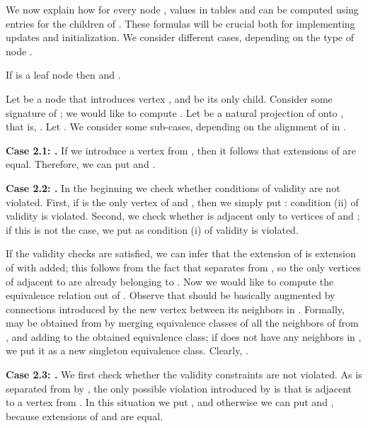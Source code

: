 \documentclass[a4paper,11pt]{article}
\theoremstyle{definition}
\theoremstyle{remark}
\begin{document}
We now explain how for every node , values in tables  and
 can be computed using entries for the children of .
These formulas will be crucial both for implementing updates and
initialization.  We consider different cases, depending on the type of
node . 

\vskip 0.3cm
 If  is a leaf node then
 and .  \vskip 0.3cm

 Let  be a node that
introduces vertex , and  be its only child.  Consider some
signature  of ; we would like to compute
.  Let  be a natural projection of  onto
, that is, .  Let
.  We consider some sub-cases, depending on the
alignment of  in .

\vskip 0.1cm {\bf{Case 2.1: .}} If we introduce a vertex from
, then it follows that extensions of  are equal.
Therefore, we can put  and
.

\vskip 0.1cm {\bf{Case 2.2: .}} In the beginning we check
whether conditions of validity are not violated.  First, if  is the
only vertex of  and , then we simply put
: condition (ii) of validity is violated.  Second, we
check whether  is adjacent only to vertices of  and ; if
this is not the case, we put  as condition (i) of
validity is violated.

If the validity checks are satisfied, we can infer that the extension
 of  is extension  of  with 
added; this follows from the fact that  separates  from ,
so the only vertices of  adjacent to  are already
belonging to .  Now we would like to compute the equivalence
relation  out of .  Observe that  should be basically
 augmented by connections introduced by the new vertex 
between its neighbors in .  Formally,  may be obtained from
 by merging equivalence classes of all the neighbors of  from
, and adding  to the obtained equivalence class; if  does
not have any neighbors in , we put it as a new singleton
equivalence class.  Clearly, .

\vskip 0.1cm

{\bf{Case 2.3: .}} We first check whether the
validity constraints are not violated.  As  is separated from 
by , the only possible violation introduced by  is that  is
adjacent to a vertex from .  In this situation we put
, and otherwise we can put
 and , because
extensions of  and  are equal.

\vskip 0.3cm
\end{document}
